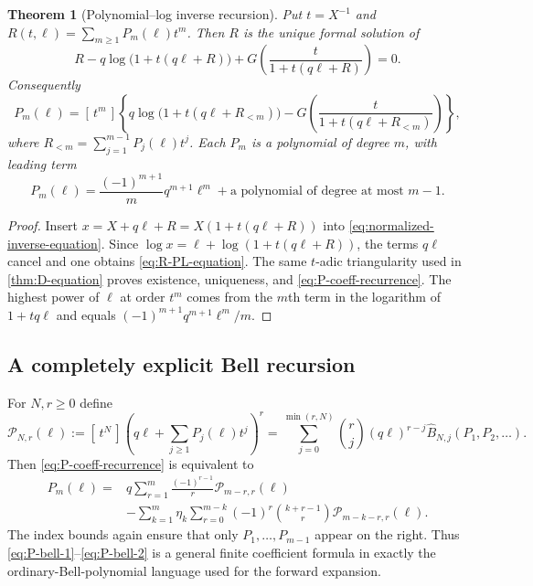 \documentclass[11pt,oneside]{article}
\numberwithin{equation}{section}
\theoremstyle{plain}
\newtheorem{theorem}{Theorem}[section]
\theoremstyle{definition}
\theoremstyle{remark}
\newcommand{\Bhat}{\widehat{B}}
\newcommand{\Coeff}[2]{[\,#1^{#2}\,]}
\begin{document}
\begin{theorem}[Polynomial--log inverse recursion]
\label{thm:P-recursion}
Put $t=X^{-1}$ and
$R(t,\ell)=\sum_{m\ge1}P_m(\ell)t^m$.  Then $R$ is the unique formal
solution of
\begin{equation}\label{eq:R-PL-equation}
 \boxed{
 R-q\log\bigl(1+t(q\ell+R)\bigr)
 +G\!\left(\frac{t}{1+t(q\ell+R)}\right)=0.}
\end{equation}
Consequently
\begin{equation}\label{eq:P-coeff-recurrence}
 \boxed{
 P_m(\ell)=\Coeff{t}{m}\left\{
 q\log\bigl(1+t(q\ell+R_{<m})\bigr)
 -G\!\left(\frac{t}{1+t(q\ell+R_{<m})}\right)
 \right\},}
\end{equation}
where $R_{<m}=\sum_{j=1}^{m-1}P_j(\ell)t^j$.  Each $P_m$ is a polynomial
of degree $m$, with leading term
\begin{equation}\label{eq:P-leading}
 P_m(\ell)=\frac{(-1)^{m+1}}m q^{m+1}\ell^m+
 \text{a polynomial of degree at most $m-1$}.
\end{equation}
\end{theorem}

\begin{proof}
Insert $x=X+q\ell+R=X(1+t(q\ell+R))$ into
\eqref{eq:normalized-inverse-equation}.  Since
$\log x=\ell+\log(1+t(q\ell+R))$, the terms $q\ell$ cancel and one obtains
\eqref{eq:R-PL-equation}.  The same $t$-adic triangularity used in
\cref{thm:D-equation} proves existence, uniqueness, and
\eqref{eq:P-coeff-recurrence}.  The highest power of $\ell$ at order $t^m$
comes from the $m$th term in the logarithm of $1+tq\ell$ and equals
$(-1)^{m+1}q^{m+1}\ell^m/m$.
\end{proof}

\subsection{A completely explicit Bell recursion}

For $N,r\ge0$ define
\begin{equation}\label{eq:A-N-r}
 \mathcal P_{N,r}(\ell):=
 \Coeff{t}{N}\left(q\ell+\sum_{j\ge1}P_j(\ell)t^j\right)^r
 =\sum_{j=0}^{\min(r,N)}\binom rj(q\ell)^{r-j}
 \Bhat_{N,j}(P_1,P_2,\ldots).
\end{equation}
Then \eqref{eq:P-coeff-recurrence} is equivalent to
\begin{align}
 P_m(\ell)={}&q\sum_{r=1}^{m}\frac{(-1)^{r-1}}r
 \mathcal P_{m-r,r}(\ell)\label{eq:P-bell-1}\\
 &-\sum_{k=1}^{m}\eta_k\sum_{r=0}^{m-k}
 (-1)^r\binom{k+r-1}{r}\mathcal P_{m-k-r,r}(\ell).
 \label{eq:P-bell-2}
\end{align}
The index bounds again ensure that only $P_1,\ldots,P_{m-1}$ appear on the
right.  Thus \eqref{eq:P-bell-1}--\eqref{eq:P-bell-2} is a general finite
coefficient formula in exactly the ordinary-Bell-polynomial language used
for the forward expansion.
\end{document}
